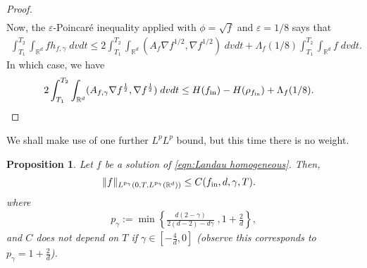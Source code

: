 \documentclass[12pt,american]{amsart}
\numberwithin{equation}{section}
\theoremstyle{plain}
\newtheorem{prop}[thm]{Proposition}
\theoremstyle{definition}                  %
\def\fin{f_{\textnormal{in}}}
\begin{document}
\begin{proof}
\begin{align*}
  \end{align*}
  Now, the $\varepsilon$-Poincar\'e inequality applied with $\phi = \sqrt{f}$ and $\varepsilon = 1/8$ says that
  \begin{align*}
    \int_{T_1}^{T_2}\int_{\mathbb{R}^d}f h_{f,\gamma}\;dvdt \leq 2\int_{T_1}^{T_2}\int_{\mathbb{R}^d}(A_f\nabla f^{1/2},\nabla f^{1/2})\;dvdt+\Lambda_f(1/8)\int_{T_1}^{T_2}\int_{\mathbb{R}^d}f\;dvdt.
  \end{align*}
  In which case, we have
  \begin{align*}
    2\int_{T_1}^{T_2}\int_{\mathbb{R}^d} (A_{f,\gamma}\nabla f^{\frac{1}{2}},\nabla f^{\frac{1}{2}}) \;dvdt 
	  & \leq H(\fin)-H(\rho_{\fin})+\Lambda_f(1/8).
  \end{align*}
\end{proof}  

We shall make use of one further $L^pL^p$ bound, but this time there is no weight.

 \begin{prop}\label{prop: LpLp bound via interpolation1}
  Let $f$ be a solution of \eqref{eqn:Landau homogeneous}. Then, 
  \begin{align*}
    \|f\|_{L^{p_{\gamma}}(0,T,L^{p_\gamma}(\mathbb{R}^d))} & \leq C(\fin,d,\gamma,T).
  \end{align*}	
  where 
  \begin{align*}
    p_\gamma := \min \left \{\frac{d(2-\gamma)}{2(d-2)-d\gamma}\;, 1+\frac{2}{d}  \right \},
  \end{align*}
  and $C$ does not depend on $T$ if $\gamma \in [-\tfrac{4}{d},0]$ (observe this corresponds to $p_\gamma = 1+\frac{2}{d}$).
  \end{prop}
  
\end{document}
